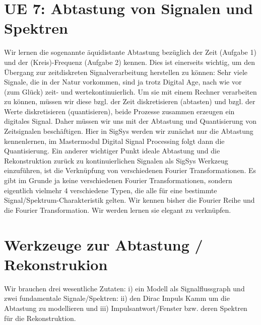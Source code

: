 \clearpage
\section{UE 7: Abtastung von Signalen und Spektren}

Wir lernen die sogenannte äquidistante Abtastung bezüglich der Zeit
(Aufgabe 1) und der (Kreis)-Frequenz (Aufgabe 2) kennen.
%
Dies ist einerseits wichtig, um den Übergang zur zeitdiskreten Signalverarbeitung
herstellen zu können: Sehr viele Signale, die in der Natur vorkommen, sind
ja trotz Digital Age, nach wie vor (zum Glück)
zeit- und wertekontinuierlich. Um sie mit einem
Rechner verarbeiten zu können, müssen wir diese bzgl. der Zeit diskretisieren
(abtasten) und bzgl. der Werte diskretisieren (quantisieren), beide Prozesse
zusammen erzeugen ein digitales Signal.
Daher müssen wir uns mit der Abtastung und Quantisierung von Zeitsignalen
beschäftigen.
Hier in SigSys werden wir zunächst nur die Abtastung kennenlernen, im Mastermodul
Digital Signal Processing folgt dann die Quantisierung.
%
Ein anderer wichtiger Punkt ideale Abtastung und die Rekonstruktion zurück
zu kontinuierlichen Signalen als SigSys Werkzeug einzuführen, ist
die Verknüpfung von verschiedenen Fourier Transformationen. Es gibt im Grunde
ja keine verschiedenen Fourier Transformationen, sondern eigentlich vielmehr
4 verschiedene Typen, die alle für eine bestimmte Signal/Spektrum-Charakteristik
gelten. Wir kennen bisher die Fourier Reihe und die Fourier Transformation.
Wir werden lernen sie elegant zu verknüpfen.

\section*{Werkzeuge zur Abtastung / Rekonstrukion}

Wir brauchen drei wesentliche Zutaten: i) ein Modell als Signalflussgraph und
zwei fundamentale Signale/Spektren: ii) den Dirac Impuls Kamm um die Abtastung
zu modellieren und iii) Impulsantwort/Fenster bzw. deren Spektren für die Rekonstruktion.


